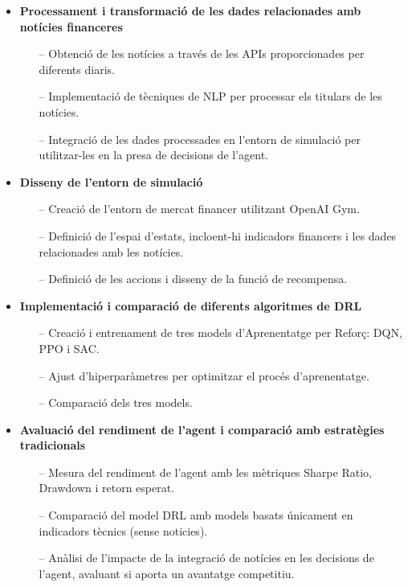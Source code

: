 \documentclass[12pt,a4paper,twoside]{book}
\begin{document}
\begin{itemize}
    \item \textbf{Processament i transformació de les dades relacionades amb notícies financeres}
    \begin{itemize}
        \item[--] Obtenció de les notícies a través de les APIs proporcionades per diferents diaris.
        \item[--] Implementació de tècniques de NLP per processar els titulars de les notícies.
        \item[--] Integració de les dades processades en l'entorn de simulació per utilitzar-les en la presa de decisions de l'agent.
    \end{itemize}

    \item \textbf{Disseny de l'entorn de simulació}
    \begin{itemize}
        \item[--] Creació de l'entorn de mercat financer utilitzant OpenAI Gym\cite{OpenAIGym}.
        \item[--] Definició de l'espai d'estats, incloent-hi indicadors financers i les dades relacionades amb les notícies.
        \item[--] Definició de les accions i disseny de la funció de recompensa.
    \end{itemize}

    \item \textbf{Implementació i comparació de diferents algoritmes de DRL}
    \begin{itemize}
        \item[--] Creació i entrenament de tres models d'Aprenentatge per Reforç: DQN, PPO i SAC.
        \item[--] Ajust d'hiperparàmetres per optimitzar el procés d'aprenentatge.
        \item[--] Comparació dels tres models.
    \end{itemize}

    \item \textbf{Avaluació del rendiment de l'agent i comparació amb estratègies tradicionals}
    \begin{itemize}
        \item[--] Mesura del rendiment de l'agent amb les mètriques Sharpe Ratio, Drawdown i retorn esperat.
        \item[--] Comparació del model DRL amb models basats únicament en indicadors tècnics (sense noticies).
        \item[--] Anàlisi de l'impacte de la integració de notícies en les decisions de l'agent, avaluant si aporta un avantatge competitiu.
    \end{itemize}
\end{itemize}
\end{document}
